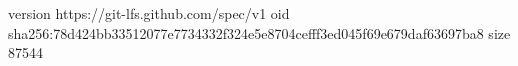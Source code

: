 version https://git-lfs.github.com/spec/v1
oid sha256:78d424bb33512077e7734332f324e5e8704cefff3ed045f69e679daf63697ba8
size 87544
